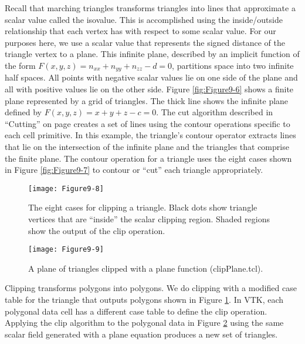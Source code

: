 Recall that marching triangles transforms triangles into lines that approximate a scalar value called the isovalue. This is accomplished using the inside/outside relationship that each vertex has with respect to some scalar value. For our purposes here, we use a scalar value that represents the signed distance of the triangle vertex to a plane. This infinite plane, described by an implicit function of the form $F(x, y, z) = n_{xx} + n_{yy} + n_{zz} - d = 0$, partitions space into two infinite half spaces. All points with negative scalar values lie on one side of the plane and all with positive values lie on the other side. Figure \ref{fig:Figure9-6} shows a finite plane represented by a grid of triangles. The thick line shows the infinite plane defined by $F(x,y,z) = x + y + z - c = 0$. The cut algorithm described in ``Cutting'' on page \pageref{subsec:cutting} creates a set of lines using the contour operations specific to each cell primitive. In this example, the triangle's contour operator extracts lines that lie on the intersection of the infinite plane and the triangles that comprise the finite plane. The contour operation for a triangle uses the eight cases shown in Figure \ref{fig:Figure9-7} to contour or ``cut'' each triangle appropriately.

\begin{figure}[!htb]
    \centering
    \texttt{[image: Figure9-8]}\\
    \caption{The eight cases for clipping a triangle. Black dots show triangle vertices that are ``inside'' the scalar clipping region. Shaded regions show the output of the clip operation.}\label{fig:Figure9-8}
\end{figure}

\begin{figure}[!htb]
    \centering
    \texttt{[image: Figure9-9]}\\
    \caption{A plane of triangles clipped with a plane function (clipPlane.tcl).}\label{fig:Figure9-9}
\end{figure}

Clipping transforms polygons into polygons. We do clipping with a modified case table for the triangle that outputs polygons shown in Figure \ref{fig:Figure9-8}. In VTK, each polygonal data cell has a different case table to define the clip operation. Applying the clip algorithm to the polygonal data in Figure \ref{fig:Figure9-9} using the same scalar field generated with a plane equation produces a new set of triangles.

